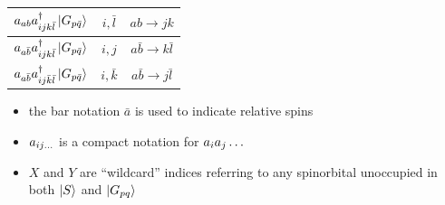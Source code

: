 \documentclass[./thesis.tex]{subfiles}
\begin{document}
\begin{table}
\begin{center}
\begin{minipage}[l]{0.5\textwidth}
\begin{tabular}{ c|c|c }
                \hline \rule{0pt}{3ex}
                $a_{ab} a^\dagger_{ijk \bar l} \ket {G_{p \bar q}}$                       &$i,\bar l$             &$ab \rightarrow jk$            \\
                \hline \rule{0pt}{3ex}
                $a_{a  \bar b} a^\dagger_{ijk \bar l} \ket {G_{p \bar q}}$                        &$i,j$          &$a \bar b \rightarrow k \bar l$                \\
                \hline \rule{0pt}{3ex}
                $a_{a  \bar b} a^\dagger_{ij \bar k \bar l} \ket {G_{p \bar q}}$                  &$i,\bar k$             &$a \bar b \rightarrow j \bar l$                \\
        \end{tabular} 
\end{minipage}
\begin{minipage}[r]{0.4\textwidth}
\begin{itemize}
\item
the bar notation $\bar a$ is used to indicate relative spins
\item
$a_{ij\ldots}$ is a compact notation for $a_{i} a_{j} \ldots$
\item
$X$ and $Y$ are ``wildcard'' indices referring to any spinorbital unoccupied in both $\ket S$ and $\ket {G_{pq}}$ 
\end{itemize}
\end{minipage}
\end{center}
\end{table}
\end{document}
